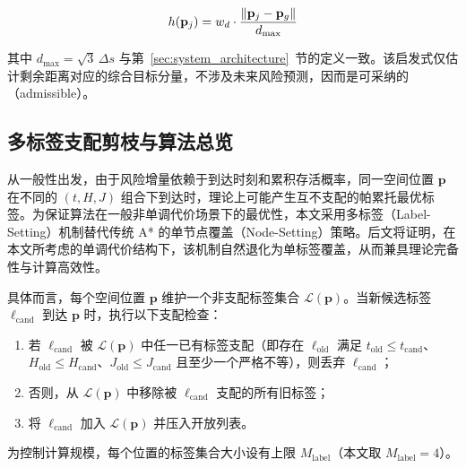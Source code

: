 \begin{equation}
h(\mathbf{p}_j) = w_d \cdot \frac{\left\lVert\mathbf{p}_j - \mathbf{p}_g\right\rVert}{d_{\max}}
\label{eq:heuristic}
\end{equation}

其中 $d_{\max}=\sqrt{3}\,\Delta s$ 与第~\ref{sec:system_architecture}~节的定义一致。该启发式仅估计剩余距离对应的综合目标分量，不涉及未来风险预测，因而是可采纳的（admissible）。

\subsection{多标签支配剪枝与算法总览}
\label{subsec:label_setting}

从一般性出发，由于风险增量依赖于到达时刻和累积存活概率，同一空间位置 $\mathbf{p}$ 在不同的 $(t, H, J)$ 组合下到达时，理论上可能产生互不支配的帕累托最优标签。为保证算法在一般非单调代价场景下的最优性，本文采用多标签（Label-Setting）机制替代传统 A* 的单节点覆盖（Node-Setting）策略。后文将证明，在本文所考虑的单调代价结构下，该机制自然退化为单标签覆盖，从而兼具理论完备性与计算高效性。

具体而言，每个空间位置 $\mathbf{p}$ 维护一个非支配标签集合 $\mathcal{L}(\mathbf{p})$。当新候选标签 $\ell_{\mathrm{cand}}$ 到达 $\mathbf{p}$ 时，执行以下支配检查：

\begin{enumerate}
\item 若 $\ell_{\mathrm{cand}}$ 被 $\mathcal{L}(\mathbf{p})$ 中任一已有标签支配（即存在 $\ell_{\mathrm{old}}$ 满足 $t_{\mathrm{old}}\leq t_{\mathrm{cand}}$、$H_{\mathrm{old}}\leq H_{\mathrm{cand}}$、$J_{\mathrm{old}}\leq J_{\mathrm{cand}}$ 且至少一个严格不等），则丢弃 $\ell_{\mathrm{cand}}$；
\item 否则，从 $\mathcal{L}(\mathbf{p})$ 中移除被 $\ell_{\mathrm{cand}}$ 支配的所有旧标签；
\item 将 $\ell_{\mathrm{cand}}$ 加入 $\mathcal{L}(\mathbf{p})$ 并压入开放列表。
\end{enumerate}

为控制计算规模，每个位置的标签集合大小设有上限 $M_{\mathrm{label}}$（本文取 $M_{\mathrm{label}}=4$）。


